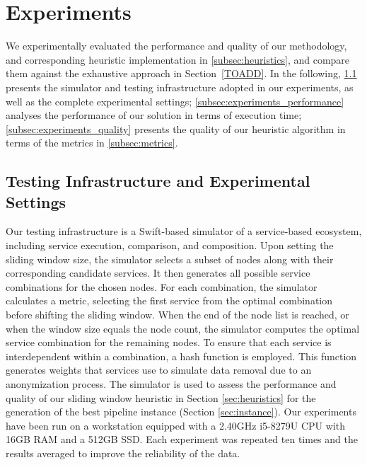 \section{Experiments}\label{sec:experiment}

We experimentally evaluated the performance and quality of our methodology,
and corresponding heuristic implementation in \cref{subsec:heuristics},
and compare them against the exhaustive approach in Section~\ref{TOADD}.
In the following,
\cref{subsec:experiments_infrastructure} presents the simulator and testing infrastructure adopted in our experiments, as well as the complete experimental settings; \cref{subsec:experiments_performance} analyses the performance of our solution in terms of execution time; \cref{subsec:experiments_quality} presents the quality of our heuristic algorithm in terms of the metrics in \cref{subsec:metrics}.

\subsection{Testing Infrastructure and Experimental Settings}\label{subsec:experiments_infrastructure}
Our testing infrastructure is a Swift-based simulator of a service-based ecosystem, including service execution, comparison, and composition.
Upon setting the sliding window size, the simulator selects a subset of nodes along with their corresponding candidate services.
It then generates all possible service combinations for the chosen nodes.
For each combination, the simulator calculates a metric, selecting the first service from the optimal combination before shifting the sliding window.
When the end of the node list is reached, or when the window size equals the node count, the simulator computes the optimal service combination for the remaining nodes.
To ensure that each service is interdependent within a combination, a hash function is employed. This function generates weights that services use to simulate data removal due to an anonymization process.
The simulator is used to assess the performance and quality of our sliding window heuristic in Section \ref{sec:heuristics} for the generation of the best pipeline instance (Section \ref{sec:instance}).
Our experiments have been run on a workstation equipped with a 2.40GHz i5-8279U CPU with 16GB RAM and a 512GB SSD.
Each experiment was repeated ten times and the results averaged to improve the reliability of the data.

